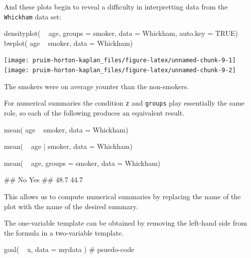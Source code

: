 And these plots begin to reveal a difficulty in interpretting data from
the \texttt{Whickham} data set:

\begin{Schunk}
\begin{Sinput}
densityplot( ~ age, groups = smoker, data = Whickham, auto.key = TRUE)
bwplot( age ~ smoker, data = Whickham)
\end{Sinput}


\begin{center}\texttt{[image: pruim-horton-kaplan\_files/figure-latex/unnamed-chunk-9-1]} \texttt{[image: pruim-horton-kaplan\_files/figure-latex/unnamed-chunk-9-2]} \end{center}

\end{Schunk}

The smokers were on average younter than the non-smokers.

For numerical summaries the condition \texttt{z} and \texttt{groups}
play essentially the same role, so each of the following produces an
equivalent result.

\begin{Schunk}
\begin{Sinput}
mean( age ~ smoker, data = Whickham)
\end{Sinput}
\end{Schunk}\begin{Schunk}
\begin{Sinput}
mean( ~ age | smoker, data = Whickham)
\end{Sinput}
\end{Schunk}\begin{Schunk}
\begin{Sinput}
mean( ~ age, groups = smoker, data = Whickham)
\end{Sinput}
\begin{Soutput}
##   No  Yes 
## 48.7 44.7
\end{Soutput}
\end{Schunk}

\noindent
This allows us to compute numerical summaries by replacing the name of
the plot with the name of the desired summary.

The one-variable template can be obtained by removing the left-hand side
from the formula in a two-variable template.

\begin{Schunk}
\begin{Sinput}
goal( ~ x, data = mydata )               # psuedo-code
\end{Sinput}
\end{Schunk}

